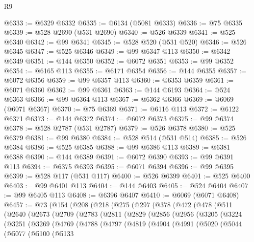 \begin{lexlean}{R9}
\begin{coremodule}
@6333 := @6329 @6332
@6335 := @6134 (@5081 @6333)
@6336 := @75 @6335
@6339 := @528 @2690 (@531 @2690)
@6340 := @526 @6339
@6341 := @525 @6340
@6342 := @99 @6341
@6345 := @528 @520 (@531 @520)
@6346 := @526 @6345
@6347 := @525 @6346
@6349 := @99 @6347 @113
@6350 := @6342 @6349
@6351 := @144 @6350
@6352 := @6072 @6351
@6353 := @99 @6352
@6354 := @6165 @113
@6355 := @6171 @6354
@6356 := @144 @6355
@6357 := @6072 @6356
@6359 := @99 @6357 @113
@6360 := @6353 @6359
@6361 := @6071 @6360
@6362 := @99 @6361
@6363 := @144 @6193
@6364 := @524 @6363
@6366 := @99 @6364 @113
@6367 := @6362 @6366
@6369 := @6069 (@6071 @6367)
@6370 := @75 @6369
@6371 := @6116 @113
@6372 := @6122 @6371
@6373 := @144 @6372
@6374 := @6072 @6373
@6375 := @99 @6374
@6378 := @528 @2787 (@531 @2787)
@6379 := @526 @6378
@6380 := @525 @6379
@6381 := @99 @6380
@6384 := @528 @514 (@531 @514)
@6385 := @526 @6384
@6386 := @525 @6385
@6388 := @99 @6386 @113
@6389 := @6381 @6388
@6390 := @144 @6389
@6391 := @6072 @6390
@6393 := @99 @6391 @113
@6394 := @6375 @6393
@6395 := @6071 @6394
@6396 := @99 @6395
@6399 := @528 @117 (@531 @117)
@6400 := @526 @6399
@6401 := @525 @6400
@6403 := @99 @6401 @113
@6404 := @144 @6403
@6405 := @524 @6404
@6407 := @99 @6405 @113
@6408 := @6396 @6407
@6410 := @6069 (@6071 @6408)
@6457 := @73
    (@154
      (@208
        (@218
          (@275
            (@297
              (@378
                (@472
                  (@478
                    (@511
                      (@2640
                        (@2673
                          (@2709
                            (@2783
                              (@2811
                                (@2829
                                  (@2856
                                    (@2956
                                      (@3205
                                        (@3224
                                          (@3251
                                            (@3269
                                              (@4769
                                                (@4788
                                                  (@4797
                                                    (@4819
                                                      (@4904
                                                        (@4991
                                                          (@5020
                                                            (@5044
                                                              (@5077
                                                                (@5100
                                                                  (@5133

\end{coremodule}
\end{lexlean}
